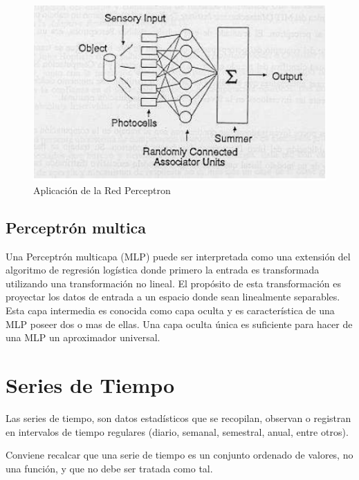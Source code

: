 \begin{figure}[H]
  \begin{center}
    \includegraphics[scale=0.90]{./perceptron.png}
    \caption{Aplicación de la Red Perceptron}
    \label{fig:perceptron}
  \end{center}
\end{figure}

\subsection{Perceptrón multica}
Una Perceptrón multicapa (MLP) puede ser interpretada como una extensión del algoritmo de regresión logística donde primero la entrada es transformada utilizando una transformación no lineal\cite{de2014aprendizaje}. El propósito de esta transformación es proyectar los datos de entrada a un espacio donde sean linealmente separables.
Esta capa intermedia es conocida como capa oculta y es característica de una MLP poseer dos o mas de ellas. Una capa oculta única es suficiente para hacer de una MLP un aproximador universal.

\section{Series de Tiempo}
Las series de tiempo, son datos estadísticos que se recopilan, observan o registran en intervalos de tiempo regulares (diario, semanal, semestral, anual, entre otros)\cite{herrera2020prediccion}. 

Conviene recalcar que una serie de tiempo es un conjunto ordenado de valores, no una función, y que no debe ser tratada como tal\cite{nava2015procesamiento}.




